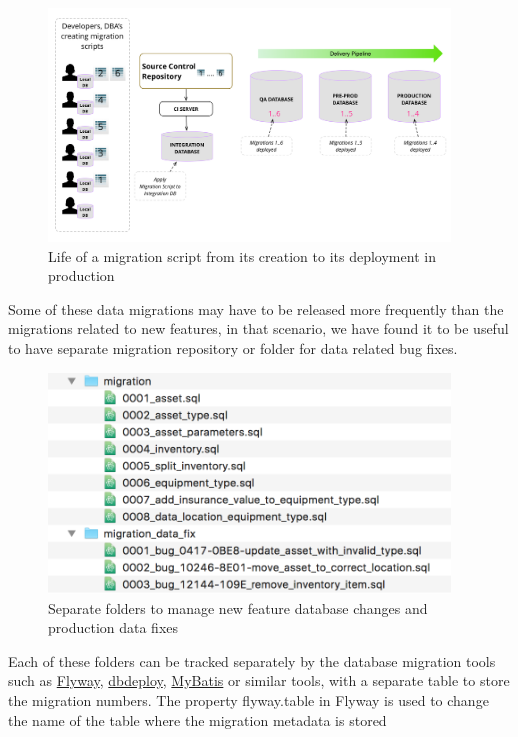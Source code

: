 \documentclass[12pt]{article}
\begin{document}
\begin{figure}[H]
  \begin{center}
    \includegraphics[width=0.95\textwidth]{migrations_lifecycle}
  \end{center}
  \caption{Life of a migration script from its creation to its deployment in production}
  \label{fig:migration-lifecycle}
\end{figure}

Some of these data migrations may have to be released more frequently
than the migrations related to new features, in that scenario, we have
found it to be useful to have separate migration repository or folder
for data related bug fixes.

\begin{figure}[H]
  \begin{center}
    \includegraphics[width=0.95\textwidth]{seperate_data_migration_folder}
  \end{center}
  \caption{Separate folders to manage new feature database changes and production data fixes}
  \label{fig:seperate-data-migration-folder}
\end{figure}

Each of these folders can be tracked separately by the database
migration tools such as \href{http://flywaydb.org/}{Flyway},
\href{http://dbdeploy.com/}{dbdeploy},
\href{https://github.com/mybatis/migrations}{MyBatis} or similar tools,
with a separate table to store the migration numbers. The property
flyway.table in Flyway is used to change the name of the table where the
migration metadata is stored
\end{document}
